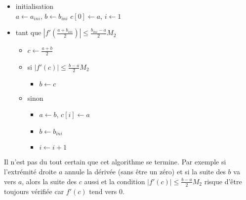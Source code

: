 \begin{enumerate}
  
\begin{itemize}
  \item initialisation \\
  $a \leftarrow a_{ini}$, $b\leftarrow b_{ini}$  $c[0] \leftarrow a$, $i\leftarrow 1$
  \item tant que $\left|f'(\frac{a+b_{ini}}{2})\right| \leq \frac{b_{ini}-a}{2}M_2$
  \begin{itemize}
    \item $c \leftarrow \frac{a+b}{2}$
    \item si $\left|f'(c)\right| \leq \frac{b-a}{2}M_2$
    \begin{itemize}
      \item $b\leftarrow c$
    \end{itemize}
    \item sinon
    \begin{itemize}
      \item $a\leftarrow b$, $c[i]\leftarrow a$
      \item $b\leftarrow b_{ini}$
      \item $i\leftarrow i+1$
    \end{itemize}
  \end{itemize}
\end{itemize}

Il n'est pas du tout certain que cet algorithme se termine. Par exemple si l'extrémité droite $a$ annule la dérivée (sans être un zéro) et si la suite des $b$ va vers $a$, alors la suite des $c$ aussi et la condition $\left|f'(c)\right| \leq \frac{b-a}{2}M_2$ risque d'être toujours vérifiée car $f'(c)$ tend vers 0.
\end{enumerate}
